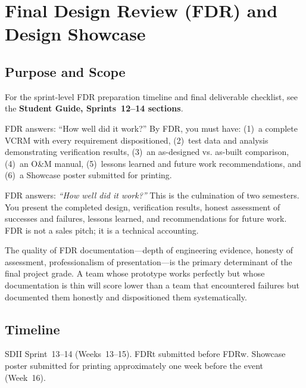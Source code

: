 \chapter{Final Design Review (FDR) and Design Showcase}

\section{Purpose and Scope}

\begin{tipbox}
For the sprint-level FDR preparation timeline and final deliverable checklist, see the \textbf{Student Guide, Sprints~12--14 sections}.
\end{tipbox}


\begin{keyconceptbox}
FDR answers: ``How well did it work?'' By FDR, you must have: (1)~a complete VCRM with every requirement dispositioned, (2)~test data and analysis demonstrating verification results, (3)~an as-designed vs. as-built comparison, (4)~an O\&M manual, (5)~lessons learned and future work recommendations, and (6)~a Showcase poster submitted for printing.
\end{keyconceptbox}

FDR answers: \emph{``How well did it work?''} This is the culmination of two semesters. You present the completed design, verification results, honest assessment of successes and failures, lessons learned, and recommendations for future work. FDR is not a sales pitch; it is a technical accounting.

The quality of FDR documentation---depth of engineering evidence, honesty of assessment, professionalism of presentation---is the primary determinant of the final project grade. A team whose prototype works perfectly but whose documentation is thin will score lower than a team that encountered failures but documented them honestly and dispositioned them systematically.

\section{Timeline}
SDII Sprint~13--14 (Weeks~13--15). FDRt submitted before FDRw. Showcase poster submitted for printing approximately one week before the event (Week~16).

